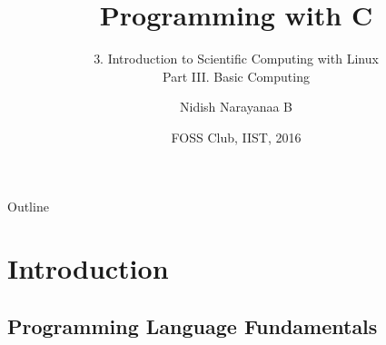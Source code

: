 \documentclass{beamer}
\title[C]{Programming with C}
\subtitle{3. Introduction to Scientific Computing with Linux\\Part III. Basic Computing}
\author[Nidish, B. N.]{Nidish Narayanaa B\inst{1}}%
\institute[IIST] %
{
  \inst{1}%
  Department of Aerospace Engineering\\
  Indian Institute of Space Science \& Technology, Trivandrum
  }
\date[IISTFOSS, 16]{FOSS Club, IIST, 2016}
\begin{document}
\begin{frame}
  \titlepage
\end{frame}

\begin{frame}{Outline}
  \tableofcontents
\end{frame}

\section{Introduction}

\subsection{Programming Language Fundamentals}
\end{document}
